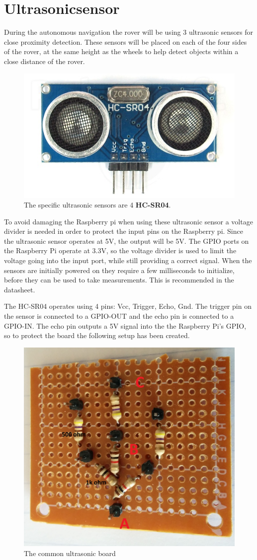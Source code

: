 \clearpage
\section{Ultrasonicsensor}

During the autonomous navigation the rover will be using 3 ultrasonic sensors for close proximity detection. These sensors will be placed on each of the four sides of the rover, at the same height as the wheels to help detect objects within a close distance of the rover.

\begin{figure}[H]
	\centering
	\includegraphics[width=.3\linewidth]{images/hcsr40.jpg}
	\caption{The specific ultrasonic sensors are 4 \textbf{HC-SR04}.}
\end{figure}


To avoid damaging the Raspberry pi  when using these ultrasonic sensor a voltage divider is needed in order to protect the input pins on the Raspberry pi. Since the ultrasonic sensor operates at 5V, the output will be 5V. The GPIO ports on the Raspberry Pi operate at 3.3V, so the voltage divider is used to limit the voltage going into the input port, while still providing a correct signal.
When the sensors are initially powered on they require a few milliseconds to initialize, before they can be used to take measurements. This is recommended in the datasheet.

The HC-SR04 operates using 4 pins: Vcc, Trigger, Echo, Gnd.
The trigger pin on the sensor is connected to a GPIO-OUT and the echo pin is connected to a GPIO-IN. The echo pin outputs a 5V signal into the the Raspberry Pi's GPIO, so to protect the board the following setup has been created.

\begin{figure}[H]
	\centering
	\includegraphics[width=.3\linewidth]{images/vd_labelled.jpg}
	\caption{The common ultrasonic board}
\end{figure}

